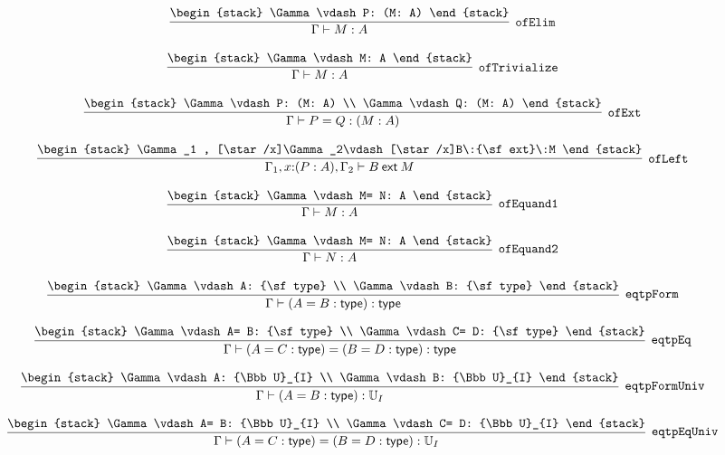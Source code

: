 \[
\infer[{\tt ofElim}]{\Gamma \vdash M: A}{
\begin{stack}
\Gamma \vdash P: (M: A)
\end{stack}}
\]

\[
\infer[{\tt ofTrivialize}]{\Gamma \vdash M: A}{
\begin{stack}
\Gamma \vdash M: A
\end{stack}}
\]

\[
\infer[{\tt ofExt}]{\Gamma \vdash P= Q: (M: A)}{
\begin{stack}
\Gamma \vdash P: (M: A)
\\
\Gamma \vdash Q: (M: A)
\end{stack}}
\]

\[
\infer[{\tt ofLeft}]{\Gamma_1 ,x\mathord{:}(P: A), \Gamma_2 \vdash B\:{\sf ext}\:M}{
\begin{stack}
\Gamma_1 , [\star /x]\Gamma_2\vdash [\star /x]B\:{\sf ext}\:M
\end{stack}}
\]

\[
\infer[{\tt ofEquand1}]{\Gamma \vdash M: A}{
\begin{stack}
\Gamma \vdash M= N: A
\end{stack}}
\]

\[
\infer[{\tt ofEquand2}]{\Gamma \vdash N: A}{
\begin{stack}
\Gamma \vdash M= N: A
\end{stack}}
\]

\[
\infer[{\tt eqtpForm}]{\Gamma \vdash (A= B: {\sf type}): {\sf type}}{
\begin{stack}
\Gamma \vdash A: {\sf type}
\\
\Gamma \vdash B: {\sf type}
\end{stack}}
\]

\[
\infer[{\tt eqtpEq}]{\Gamma \vdash (A= C: {\sf type})= (B= D: {\sf type}): {\sf type}}{
\begin{stack}
\Gamma \vdash A= B: {\sf type}
\\
\Gamma \vdash C= D: {\sf type}
\end{stack}}
\]

\[
\infer[{\tt eqtpFormUniv}]{\Gamma \vdash (A= B: {\sf type}): {\Bbb U}_{I}}{
\begin{stack}
\Gamma \vdash A: {\Bbb U}_{I}
\\
\Gamma \vdash B: {\Bbb U}_{I}
\end{stack}}
\]

\[
\infer[{\tt eqtpEqUniv}]{\Gamma \vdash (A= C: {\sf type})= (B= D: {\sf type}): {\Bbb U}_{I}}{
\begin{stack}
\Gamma \vdash A= B: {\Bbb U}_{I}
\\
\Gamma \vdash C= D: {\Bbb U}_{I}
\end{stack}}
\]

